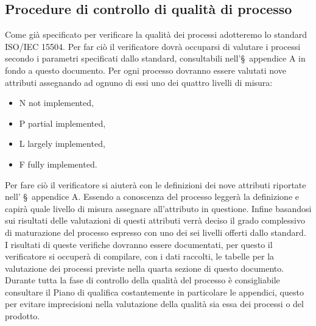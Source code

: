 \subsection{Procedure di controllo di qualità di processo}
Come già specificato per verificare la qualità dei processi adotteremo lo standard ISO/IEC 15504. Per far ciò il verificatore dovrà occuparsi di valutare i processi secondo i parametri specificati dallo standard, consultabili nell'\S\ appendice A in fondo a questo documento.
Per ogni processo dovranno essere valutati nove attributi assegnando ad ognuno di essi uno dei quattro livelli di misura: 
\begin{itemize}
\item N not implemented, 
\item P partial implemented, 
\item L largely implemented, 
\item F fully implemented.
\end{itemize}
Per fare ciò il verificatore si aiuterà con le definizioni dei nove attributi riportate nell' \S\ appendice A. Essendo a conoscenza del processo leggerà la definizione e capirà quale livello di misura assegnare all'attributo in questione.
Infine basandosi sui risultati delle valutazioni di questi attributi verrà deciso il grado complessivo di maturazione del processo espresso con uno dei sei livelli offerti dallo standard. I risultati di queste verifiche dovranno essere documentati, per questo il verificatore si occuperà di compilare, con i dati raccolti, le tabelle per la valutazione dei processi previste nella quarta sezione di questo documento.
Durante tutta la fase di controllo della qualità del processo è consigliabile consultare il Piano di qualifica costantemente in particolare le appendici, questo per evitare imprecisioni nella valutazione della qualità sia essa dei processi o del prodotto.